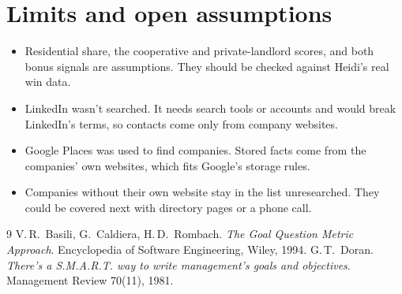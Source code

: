 \documentclass[11pt,a4paper]{article}
\begin{document}
\section{Limits and open assumptions}
\begin{itemize}
  \item Residential share, the cooperative and private-landlord scores, and both bonus signals
        are assumptions. They should be checked against Heidi's real win data.
  \item LinkedIn wasn't searched. It needs search tools or accounts and would break LinkedIn's
        terms, so contacts come only from company websites.
  \item Google Places was used to find companies. Stored facts come from the companies' own
        websites, which fits Google's storage rules.
  \item Companies without their own website stay in the list unresearched. They could be covered
        next with directory pages or a phone call.
\end{itemize}

\begin{thebibliography}{9}
 V.\,R.~Basili, G.~Caldiera, H.\,D.~Rombach. \emph{The Goal Question Metric
  Approach}. Encyclopedia of Software Engineering, Wiley, 1994.
 G.\,T.~Doran. \emph{There's a S.M.A.R.T. way to write management's goals and
  objectives}. Management Review 70(11), 1981.
\end{thebibliography}
\end{document}
